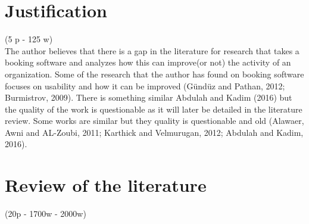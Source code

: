\documentclass[version=last,fontsize=13pt]{scrartcl}
\begin{document}
\section{Justification}(5 p - 125 w)\\
	\indent
	The author believes that there is a gap in the literature for  research that takes a booking software and analyzes how this can improve(or not) the activity of an organization.
	Some of the research that the author has found on booking software focuses on usability and how it can be improved (Gündüz and  Pathan, 2012; Burmistrov, 2009). There is something similar  Abdulah and Kadim (2016) but the quality of the work is questionable as it will later be detailed in the literature review. Some works are similar but they  quality is questionable and old (Alawaer, Awni and AL-Zoubi, 2011; Karthick and Velmurugan, 2012; Abdulah and Kadim, 2016).

\pagebreak

\section{Review of the literature } (20p - 1700w - 2000w)\\



\end{document}

